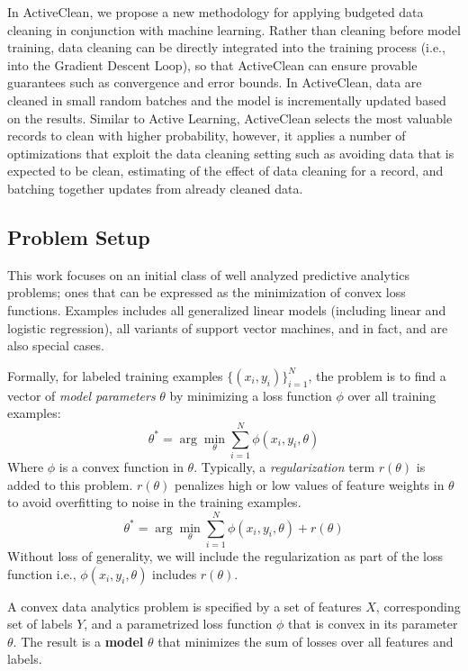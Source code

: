 
In ActiveClean, we propose a new methodology for applying budgeted data cleaning in conjunction with machine learning.
Rather than cleaning before model training, data cleaning can be directly integrated into the training process (i.e., into the Gradient Descent Loop), so that ActiveClean can ensure provable guarantees such as convergence and error bounds.
In ActiveClean, data are cleaned in small random batches and the model is incrementally updated based on the results.
Similar to Active Learning, ActiveClean selects the most valuable records to clean with higher probability, however, it applies a number of optimizations that exploit the data cleaning setting such as avoiding data that is expected to be clean, estimating of the effect of data cleaning for a record, and batching together updates from already cleaned data.

\subsection{Problem Setup}
This work focuses on an initial class of well analyzed predictive analytics problems; ones that can be expressed as the minimization of convex loss functions.
Examples includes all generalized linear models (including linear and logistic regression), all variants of support vector machines, and in fact, \avgfunc and \medfunc are also special cases. 

Formally, for labeled training examples $\{(x_{i},y_{i})\}_{i=1}^{N}$, the problem is to find a vector of \emph{model parameters} $\theta$ by minimizing a loss function $\phi$ over all training examples:
\[
 \theta^{*}=\arg\min_{\theta}\sum_{i=1}^{N}\phi(x_{i},y_{i},\theta)
\]
Where $\phi$ is a convex function in $\theta$.
Typically, a \emph{regularization} term $r(\theta)$ is added to this problem.
$r(\theta)$ penalizes high or low values of feature weights in $\theta$ to avoid overfitting to noise in the training examples.
\[
 \theta^{*}=\arg\min_{\theta}\sum_{i=1}^{N}\phi(x_{i},y_{i},\theta) + r(\theta)
\]
Without loss of generality, we will include the regularization as part of the loss function i.e., $\phi(x_{i},y_{i},\theta)$ includes $r(\theta)$.

\begin{definition}
A convex data analytics problem is specified by a set of features $X$, corresponding set of labels $Y$, and a parametrized loss function $\phi$ that is convex in its parameter $\theta$.
The result is a \textbf{model} $\theta$ that minimizes the sum of losses over all features and labels.
\end{definition}

